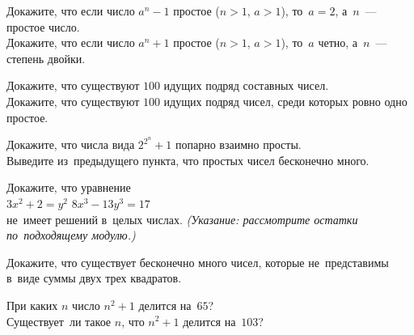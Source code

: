 


\begin{problems}

\item
\subproblem
Докажите, что если число $a^{n} - 1$ простое ($n > 1$, $a > 1$), то~$a = 2$,
а~$n$~--- простое число.
\\
\subproblem
Докажите, что если число $a^{n} + 1$ простое ($n > 1$, $a > 1$), то~$a$ четно,
а~$n$~--- степень двойки.

\item
\subproblem
Докажите, что существуют $100$ идущих подряд составных чисел.
\\
\subproblem
Докажите, что существуют $100$ идущих подряд чисел, среди которых ровно одно
простое.

\item
\subproblem
Докажите, что числа вида $2^{2^n} + 1$ попарно взаимно просты.
\\
\subproblem
Выведите из~предыдущего пункта, что простых чисел бесконечно много.

\item
Докажите, что уравнение
\\
\subproblem $3 x^2 + 2 = y^2$
\qquad
\subproblem $8 x^3 - 13 y^3 = 17$
\\
не~имеет решений в~целых числах.
\emph{(Указание: рассмотрите остатки по~подходящему модулю.)}

\item
Докажите, что существует бесконечно много чисел, которые не~представимы в~виде
суммы
\quad
\subproblem двух
\quad
\subproblem трех
\quad
квадратов.

\item
\subproblem
При каких $n$ число $n^2 + 1$ делится на~$65$?
\\
\subproblem
Существует~ли такое $n$, что $n^2 + 1$ делится на~$103$?

\end{problems}


